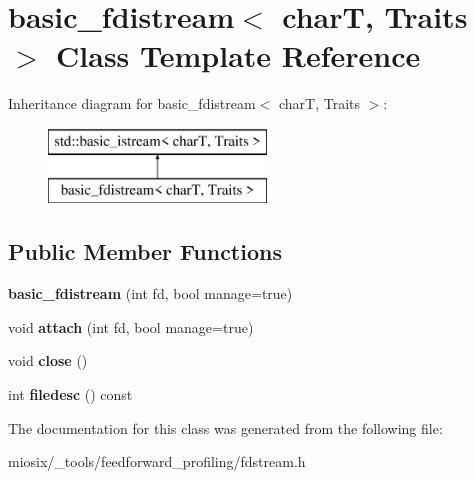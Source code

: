 \hypertarget{classbasic__fdistream}{\section{basic\-\_\-fdistream$<$ char\-T, Traits $>$ Class Template Reference}
\label{classbasic__fdistream}
}
Inheritance diagram for basic\-\_\-fdistream$<$ char\-T, Traits $>$\-:\begin{figure}[H]
\begin{center}
\leavevmode
\includegraphics[height=2.000000cm]{classbasic__fdistream}
\end{center}
\end{figure}
\subsection*{Public Member Functions}
\begin{DoxyCompactItemize}
\item 
\hypertarget{classbasic__fdistream_aef4748155e8f9c740fa4594e0d8ce084}{{\bfseries basic\-\_\-fdistream} (int fd, bool manage=true)}\label{classbasic__fdistream_aef4748155e8f9c740fa4594e0d8ce084}

\item 
\hypertarget{classbasic__fdistream_a71e92d53e8a6354babfae33332b80f7e}{void {\bfseries attach} (int fd, bool manage=true)}\label{classbasic__fdistream_a71e92d53e8a6354babfae33332b80f7e}

\item 
\hypertarget{classbasic__fdistream_a003e0673bf3d43774df7f125231ccadd}{void {\bfseries close} ()}\label{classbasic__fdistream_a003e0673bf3d43774df7f125231ccadd}

\item 
\hypertarget{classbasic__fdistream_a96ee78f1ab002da1646a4e87cd66848b}{int {\bfseries filedesc} () const }\label{classbasic__fdistream_a96ee78f1ab002da1646a4e87cd66848b}

\end{DoxyCompactItemize}


The documentation for this class was generated from the following file\-:\begin{DoxyCompactItemize}
\item 
miosix/\-\_\-tools/feedforward\-\_\-profiling/fdstream.\-h\end{DoxyCompactItemize}
